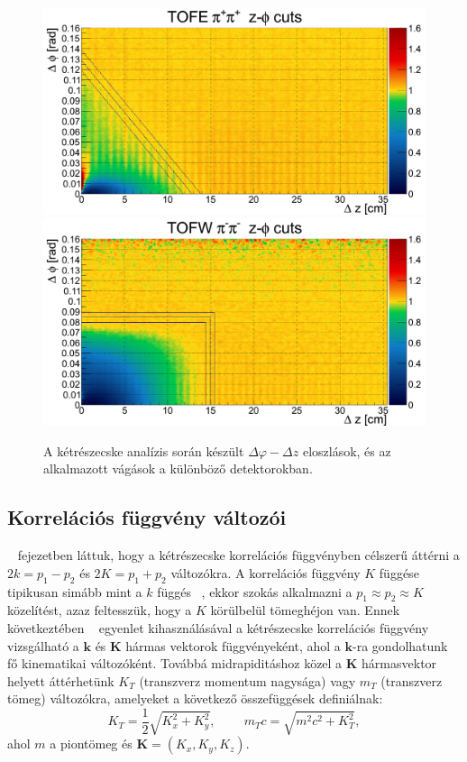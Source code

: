 \documentclass[11pt,a4paper]{article}
\numberwithin{equation}{subsection}
\numberwithin{figure}{section}
\begin{document}
\begin{figure}[H]
\includegraphics[scale=0.17]{pic/dat/kd/Corr_TOFE_dzdp_pp.png}
\includegraphics[scale=0.17]{pic/dat/kd/Corr_TOFW_dzdp_mm.png}
\caption{A kétrészecske analízis során készült $\Delta\varphi-\Delta z$ eloszlások, és az alkalmazott vágások a különböző detektorokban.}
\label{fig:paircuts2}
\end{figure}


\subsection{Korrelációs függvény változói}

~ fejezetben láttuk, hogy a kétrészecske korrelációs függvényben célszerű áttérni a $2k=p_1-p_2$ és $2K=p_1+p_2$ változókra. A korrelációs függvény  $K$ függése tipikusan simább mint a $k$ függés ~\cite{Lisa:2005dd}, ekkor szokás alkalmazni a $p_1\approx p_2\approx K$ közelítést, azaz feltesszük, hogy a $K$ körülbelül tömeghéjon van. Ennek következtében ~ egyenlet kihasználásával a kétrészecske korrelációs függvény vizsgálható a $\bm{k}$ és $\bm{K}$ hármas vektorok függvényeként, ahol a $\bm{k}$-ra gondolhatunk fő kinematikai változóként. Továbbá midrapiditáshoz közel a $\bm{K}$ hármasvektor helyett áttérhetünk $K_T$ (transzverz momentum nagysága) vagy $m_T$ (transzverz tömeg) változókra, amelyeket a következő összefüggések definiálnak:
\begin{equation}
K_T = \frac{1}{2}\sqrt{K_x^2+K_y^2},\;\;\;\;\;\;\;\;
m_Tc = \sqrt{m^2c^2+K_T^2},
\end{equation}
ahol $m$ a piontömeg és $\bm{K}=(K_x, K_y, K_z)$.
\end{document}

